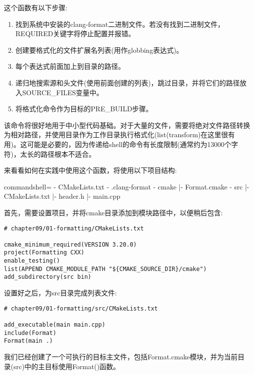 这个函数有以下步骤:

\begin{enumerate}
\item 
找到系统中安装的clang-format二进制文件。若没有找到二进制文件，REQUIRED关键字将停止配置并报错。

\item 
创建要格式化的文件扩展名列表(用作globbing表达式)。

\item 
每个表达式前面加上到目录的路径。

\item 
递归地搜索源和头文件(使用前面创建的列表)，跳过目录，并将它们的路径放入SOURCE\_FILES变量中。

\item 
将格式化命令作为目标的PRE\_BUILD步骤。
\end{enumerate}

该命令将很好地用于中小型代码基础。对于大量的文件，需要将绝对文件路径转换为相对路径，并使用目录作为工作目录执行格式化(list(transform)在这里很有用)。这可能是必要的，因为传递给shell的命令有长度限制(通常约为13000个字符)，太长的路径根本不适合。

来看看如何在实践中使用这个函数，将使用以下项目结构:

\begin{tcblisting}{commandshell={}}
- CMakeLists.txt
- .clang-format
- cmake
    |- Format.cmake
- src
    |- CMakeLists.txt
    |- header.h
    |- main.cpp
\end{tcblisting}

首先，需要设置项目，并将cmake目录添加到模块路径中，以便稍后包含:

\begin{lstlisting}[style=styleCMake]
# chapter09/01-formatting/CMakeLists.txt

cmake_minimum_required(VERSION 3.20.0)
project(Formatting CXX)
enable_testing()
list(APPEND CMAKE_MODULE_PATH "${CMAKE_SOURCE_DIR}/cmake")
add_subdirectory(src bin)
\end{lstlisting}

设置好之后，为src目录完成列表文件:

\begin{lstlisting}[style=styleCMake]
# chapter09/01-formatting/src/CMakeLists.txt

add_executable(main main.cpp)
include(Format)
Format(main .)
\end{lstlisting}

我们已经创建了一个可执行的目标主文件，包括Format.cmake模块，并为当前目录(src)中的主目标使用Format()函数。

